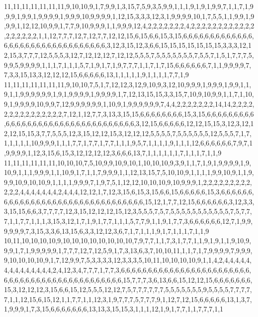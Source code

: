 11,11,11,11,11,11,11,9,10,10,9,1,7,9,9,1,3,15,7,5,9,3,5,9,9,1,1,1,9,1,9,1,9,9,7,1,1,7,1,9,9,9,1,9,9,1,9,9,9,9,1,9,9,9,10,9,9,9,9,1,12,15,3,3,3,12,3,1,9,9,9,9,10,1,7,5,5,1,1,9,9,1,9,9,9,1,12,12,10,9,9,1,7,7,9,10,9,9,9,1,1,9,9,9,12,4,2,2,2,2,2,2,2,4,2,2,2,2,2,2,2,2,2,2,2,2,2,2,2,2,2,2,1,1,12,7,7,7,12,7,12,7,7,12,12,15,6,15,6,6,15,3,15,6,6,6,6,6,6,6,6,6,6,6,6,6,6,6,6,6,6,6,6,6,6,6,6,6,6,6,6,6,6,6,6,3,12,3,15,12,3,6,6,15,15,15,15,15,15,15,3,3,3,12,12,15,3,7,7,7,12,5,5,5,3,12,7,12,12,12,7,12,12,5,5,5,7,5,5,5,5,5,5,5,7,5,5,7,1,5,1,7,7,7,5,9,9,5,9,9,9,9,1,1,1,7,1,1,1,5,7,1,9,1,7,1,9,7,7,7,1,1,7,1,7,15,6,6,6,6,6,6,7,1,1,9,9,9,9,7,7,3,3,15,13,3,12,12,12,15,6,6,6,6,6,13,1,1,1,1,1,9,1,1,1,1,7,7,1,9
11,11,11,11,11,11,11,9,10,10,7,5,1,7,12,12,3,12,9,10,9,3,12,10,9,9,9,1,9,9,9,1,9,9,1,1,9,1,1,9,9,9,9,9,9,1,9,1,9,9,9,9,1,9,9,9,9,1,7,12,13,15,15,3,3,15,7,10,9,10,9,9,1,1,7,1,10,9,1,9,9,9,9,10,9,9,7,12,9,9,9,9,9,9,1,10,9,1,9,9,9,9,9,9,7,4,4,2,2,2,2,2,2,2,14,14,2,2,2,2,2,2,2,2,2,2,2,2,2,2,2,7,12,1,12,7,7,3,13,3,15,15,6,6,6,6,6,6,6,6,15,3,15,6,6,6,6,6,6,6,6,6,6,6,6,6,6,6,6,6,6,6,6,6,6,6,6,6,6,6,6,6,6,6,6,6,3,12,15,6,6,6,6,6,12,12,15,15,3,12,3,12,12,12,15,15,3,7,7,5,5,5,12,3,15,12,12,15,3,12,12,12,5,5,5,5,7,5,5,5,5,5,5,12,5,5,5,7,1,7,1,1,1,1,1,10,9,9,9,1,1,1,7,7,1,7,7,1,7,7,1,1,1,9,5,7,1,1,1,1,9,1,1,1,12,6,6,6,6,6,6,7,9,7,1,9,9,9,9,1,12,3,15,6,15,3,12,12,12,12,3,6,6,6,13,7,1,1,1,1,1,1,7,1,1,1,7,1,1,9
11,11,11,11,11,11,10,10,10,7,5,10,9,9,10,9,10,1,10,10,10,9,3,9,1,1,7,1,9,1,9,9,9,9,1,9,10,9,1,1,1,9,9,9,1,1,10,9,1,7,1,1,7,9,9,9,1,1,12,13,15,7,5,10,10,9,1,1,1,1,9,9,10,9,1,1,9,9,9,10,9,10,10,9,1,1,1,1,9,9,9,7,1,9,7,5,1,12,12,10,10,10,9,10,9,9,9,1,2,2,2,2,2,2,2,2,2,2,2,2,4,4,4,4,4,4,4,2,4,4,4,12,12,1,7,12,3,15,6,15,3,15,6,6,15,6,6,6,6,6,15,3,6,6,6,6,6,6,6,6,6,6,6,6,6,6,6,6,6,6,6,6,6,6,6,6,6,6,6,6,6,6,6,6,15,12,1,7,7,12,15,6,6,6,6,6,6,3,12,3,3,3,15,15,6,6,3,7,7,7,7,12,3,15,12,12,12,15,12,3,5,5,5,7,5,7,5,5,5,5,5,5,5,5,5,5,5,7,5,7,7,7,1,1,7,7,1,1,1,3,15,3,12,1,7,1,9,1,7,7,1,1,1,5,7,7,9,1,1,9,1,7,7,3,6,6,6,6,6,6,12,7,1,9,9,9,9,9,9,7,3,15,3,3,6,13,15,6,3,3,12,12,3,6,7,1,7,1,1,1,9,1,7,1,1,1,7,1,1,9
10,11,10,10,10,10,9,10,10,10,10,10,10,10,10,7,9,7,7,1,1,7,3,1,7,7,1,1,9,1,9,1,1,9,10,9,9,9,1,7,1,9,9,9,9,9,1,7,7,7,12,7,12,5,9,1,7,3,13,6,3,7,10,10,11,1,1,7,1,7,9,9,9,9,7,9,9,9,9,10,10,10,10,9,1,7,12,9,9,7,5,3,3,3,3,12,3,3,3,5,10,11,10,10,10,10,9,1,1,4,2,4,4,4,4,4,4,4,4,4,4,4,4,4,4,2,4,12,3,4,7,7,7,1,7,7,3,6,6,6,6,6,6,6,6,6,6,6,6,6,6,6,6,6,6,6,6,6,6,6,6,6,6,6,6,6,6,6,6,6,6,6,6,6,6,6,6,6,6,6,6,6,6,15,7,7,7,3,6,13,6,6,15,12,12,15,6,6,6,6,6,6,6,15,3,12,12,12,3,15,6,6,15,12,5,5,5,12,12,7,5,7,7,7,7,7,7,5,5,5,5,5,5,5,9,5,5,5,5,7,7,7,7,7,1,1,12,15,6,15,12,1,1,7,7,1,1,12,3,1,9,7,7,7,5,7,7,7,9,1,12,7,12,15,6,6,6,6,6,13,1,3,7,1,9,9,9,1,7,3,15,6,6,6,6,6,6,6,13,13,3,15,15,3,1,1,1,12,1,9,1,7,7,1,1,7,7,7,1,1
